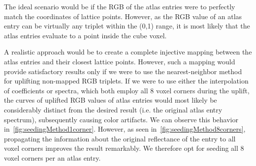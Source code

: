The ideal scenario would be if the RGB of the atlas entries were to perfectly match the coordinates of lattice points. However, as the RGB value of an atlas entry can be virtually any triplet within the (0,1) range, it is most likely that the atlas entries evaluate to a point inside the cube voxel.

A realistic approach would be to create a complete injective mapping between the atlas entries and their closest lattice points. However, such a mapping would provide satisfactory results only if we were to use the nearest-neighbor method for uplifting non-mapped RGB triplets. If we were to use either the interpolation of coefficients or spectra, which both employ all 8 voxel corners during the uplift, the curves of uplifted RGB values of atlas entries would most likely be considerably distinct from the desired result (i.e. the original atlas entry spectrum), subsequently causing color artifacts. We can observe this behavior in~\cref{fig:seedingMethod1corner}. However, as seen in~\cref{fig:seedingMethod8corners}, propagating the information about the original reflectance of the entry to all voxel corners improves the result remarkably. We therefore opt for seeding all 8 voxel corners per an atlas entry.

